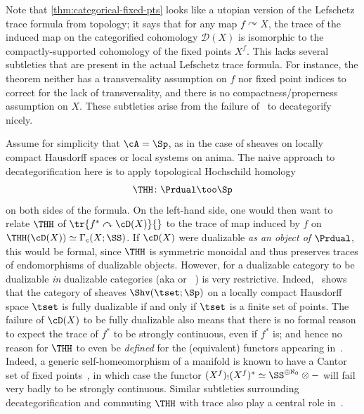 \begin{rmk}\label{rmk:utopian-lefschetz}
  Note that \cref{thm:categorical-fixed-pts} looks like a utopian version of the Lefschetz trace formula from topology; it says that for any map $f\curvearrowright X$, the trace of the induced map on the categorified cohomology $\mathcal D(X)$ is isomorphic to the compactly-supported cohomology of the fixed points $X^f$. This lacks several subtleties that are present in the actual Lefschetz trace formula. For instance, the theorem neither has a transversality assumption on $f$ nor fixed point indices to correct for the lack of transversality, and there is no compactness/properness assumption on $X$. These subtleties arise from the failure of~ to decategorify nicely.

  Assume for simplicity that $\cA = \Sp$, as in the case of sheaves on locally compact Hausdorff spaces or local systems on anima. The naive approach to decategorification here is to apply topological Hochschild homology
  \[
    \THH\colon\Prdual\too\Sp
  \]
  on both sides of the formula. On the left-hand side, one would then want to relate $\THH$ of $\tr{f^*\curvearrowright\cD (X)}{}$ to the trace of map induced by $f$ on $\THH(\cD (X))\simeq\Gamma_c(X;\SS )$. If $\cD (X)$ were dualizable \emph{as an object of $\Prdual$}, this would be formal, since $\THH$ is symmetric monoidal and thus preserves traces of endomorphisms of dualizable objects. However, for a dualizable category to be dualizable \emph{in} dualizable categories (aka  or ~\cite{Kontsevich2005}) is very restrictive. Indeed,~\cite{Harr2026} shows that the category of sheaves $\Shv (\tset ;\Sp )$ on a locally compact Hausdorff space $\tset$ is fully dualizable if and only if $\tset$ is a finite set of points. The failure of $\cD (X)$ to be fully dualizable also means that there is no formal reason to expect the trace of $f^*$ to be strongly continuous, even if $f^*$ is; and hence no reason for $\THH$ to even be \emph{defined} for the (equivalent) functors appearing in~. Indeed, a generic self-homeomorphism of a manifold is known to have a Cantor set of fixed points~\cite{Craciun2013}, in which case the functor $(X^f)_!(X^f)^*\simeq\SS^{\oplus\aleph_0}\otimes{-}$ will fail very badly to be strongly continuous. Similar subtleties surrounding decategorification and commuting $\THH$ with trace also play a central role in~\cite{Beraldo_Pippi2024}.
\end{rmk}

